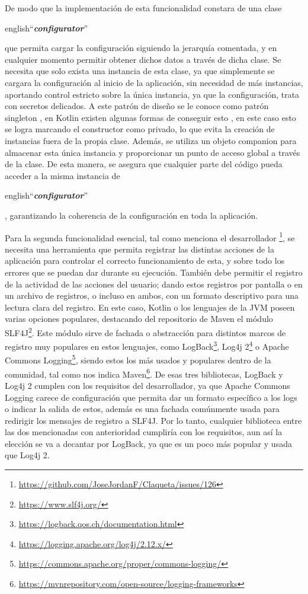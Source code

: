 De modo que la implementación de esta funcionalidad constara de una clase \begin{otherlanguage} {english}``\textit{\textbf{configurator}}''\end{otherlanguage} que permita cargar la configuración siguiendo la 
jerarquía comentada, y en cualquier momento permitir obtener dichos datos a través de dicha clase. Se necesita que
solo exista una instancia de esta clase, ya que simplemente se cargara la configuración al inicio de la aplicación, 
sin necesidad de más instancias, aportando control estricto sobre la única instancia, ya que la configuración,
trata con secretos delicados. A este patrón de diseño se le conoce como patrón singleton \cite{PattSingl}, en Kotlin 
existen algunas formas de conseguir esto \cite{SinglKotlin}, en este caso esto se logra marcando el constructor como 
privado, lo que evita la creación de instancias fuera de la propia clase. Además, se utiliza un objeto companion 
para almacenar esta única instancia y proporcionar un punto de acceso global a través de la clase. De esta manera, 
se asegura que cualquier parte del código pueda acceder a la misma instancia de \begin{otherlanguage} {english}``\textit{\textbf{configurator}}''\end{otherlanguage}, garantizando la coherencia de la configuración en 
toda la aplicación.

Para la segunda funcionalidad esencial, tal como menciona el desarrollador 
\footnote{\url{https://github.com/JoseJordanF/Claqueta/issues/126}}, se necesita una herramienta que permita 
registrar las distintas acciones de la aplicación para controlar el correcto funcionamiento de esta, y sobre todo 
los errores que se puedan dar durante su ejecución. También debe permitir el registro de la actividad de las 
acciones del usuario; dando estos registros por pantalla o en un archivo de registros, o incluso en ambos, con un 
formato descriptivo para una lectura clara del registro. En este caso, Kotlin o los lenguajes de la JVM poseen 
varias opciones populares, destacando del repositorio de Maven el módulo 
SLF4J\footnote{\url{https://www.slf4j.org/}}. Este módulo sirve de fachada o abstracción para distintos marcos de 
registro muy populares en estos lenguajes, como LogBack\footnote{\url{https://logback.qos.ch/documentation.html}}, 
Log4j 2\footnote{\url{https://logging.apache.org/log4j/2.12.x/}} o Apache Commons 
Logging\footnote{\url{https://commons.apache.org/proper/commons-logging/}}, siendo estos los más usados y populares 
dentro de la comunidad, tal como nos indica Maven\footnote{\url{https://mvnrepository.com/open-source/logging-frameworks}}. 
De esas tres bibliotecas, LogBack y Log4j 2 cumplen con los requisitos del desarrollador, ya que Apache Commons 
Logging carece de configuración que permita dar un formato específico a los logs o indicar la salida de estos, 
además es una fachada comúnmente usada para redirigir los mensajes de registro a SLF4J. Por lo tanto, cualquier 
biblioteca entre las dos mencionadas con anterioridad cumpliría con los requisitos, aun así la elección se va a 
decantar por LogBack, ya que es un poco más popular y usada que Log4j 2.

